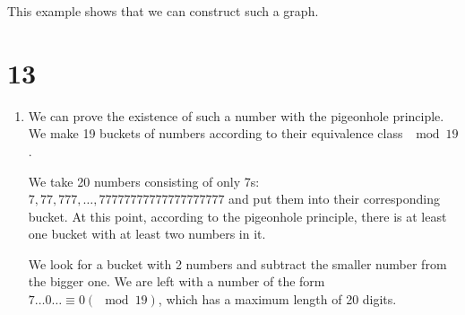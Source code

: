 \documentclass[12pt]{article}
\begin{document}
This example shows that we can construct such a graph.

\section*{13}
\begin{enumerate}[a]
	\item %
	We can prove the existence of such a number with the pigeonhole principle. We make 19 buckets of numbers according to their equivalence class $\mod 19$.

	We take 20 numbers consisting of only 7s: $7, 77, 777, \dots, 77777777777777777777$ and put them into their corresponding bucket. At this point, according to the pigeonhole principle, there is at least one bucket with at least two numbers in it.

	We look for a bucket with 2 numbers and subtract the smaller number from the bigger one. We are left with a number of the form $7 \dots 0 \dots \equiv 0 (\mod 19)$, which has a maximum length of 20 digits.


\end{enumerate}
\end{document}
